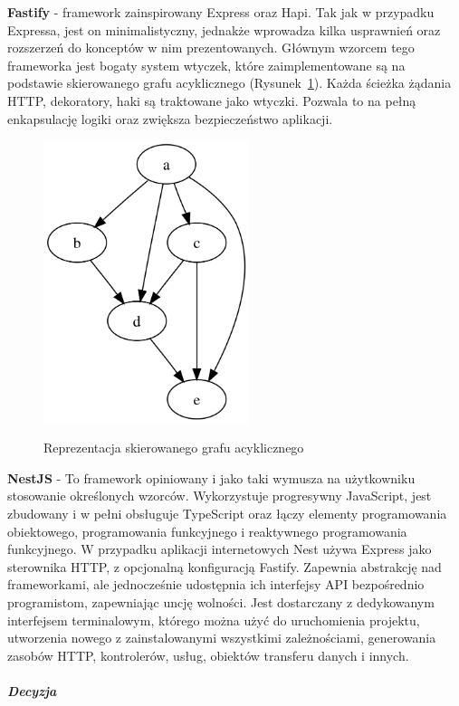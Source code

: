 \documentclass[12pt, a4paper, twoside, openany]{book}
\begin{document}
\textbf{Fastify} - framework zainspirowany Express oraz Hapi. Tak jak w przypadku Expressa,
jest on minimalistyczny, jednakże wprowadza kilka usprawnień oraz rozszerzeń do
konceptów w nim prezentowanych. Głównym wzorcem tego frameworka jest bogaty system
wtyczek, które zaimplementowane są na podstawie skierowanego grafu acyklicznego (Rysunek~\ref{fig:ADG}). %
Każda ścieżka żądania HTTP, dekoratory, haki są traktowane jako wtyczki.
Pozwala to na pełną enkapsulację logiki oraz zwiększa bezpieczeństwo aplikacji.

\begin{figure}[h]
    \caption{Reprezentacja skierowanego grafu acyklicznego}
    \includegraphics[width=6cm]{../ADG.png}
    \centering
    \label{fig:ADG}
\end{figure}

\textbf{NestJS} - To framework opiniowany i jako taki wymusza na użytkowniku stosowanie określonych wzorców.
Wykorzystuje progresywny JavaScript, jest zbudowany i w pełni obsługuje TypeScript oraz łączy elementy
programowania obiektowego, programowania funkcyjnego i reaktywnego programowania funkcyjnego.
W przypadku aplikacji internetowych Nest używa Express jako sterownika HTTP,
z opcjonalną konfiguracją Fastify. Zapewnia abstrakcję nad frameworkami,
ale jednocześnie udostępnia ich interfejsy API bezpośrednio programistom, zapewniając uncję wolności.
Jest dostarczany z dedykowanym interfejsem terminalowym, którego można użyć do uruchomienia projektu,
utworzenia nowego z zainstalowanymi wszystkimi zależnościami, generowania zasobów HTTP,
kontrolerów, usług, obiektów transferu danych i innych.

\subparagraph{Decyzja\\}
\end{document}
